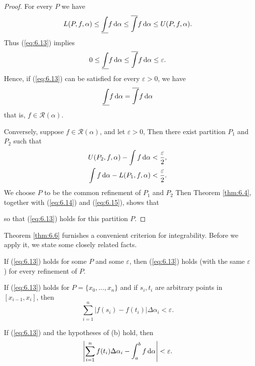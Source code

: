 \begin{proof}
    For every $P$ we have 
    \begin{equation*}
        L(P, f, \alpha)  \leq
        \underline{\int} f \d \alpha \leq
        \overline{\int}  f \d \alpha \leq
        U(P, f, \alpha) .
    \end{equation*}
    Thus (\ref{eq:6.13}) implies 
    \begin{equation*}
        0 \leq
        \underline{\int} f \d \alpha \leq
        \overline{\int}  f \d \alpha \leq
        \varepsilon .
    \end{equation*}
    Hence, if (\ref{eq:6.13}) can be satisfied for every $\varepsilon >0$,
    we have 
    \begin{equation*}
        \underline{\int} f \d \alpha =
        \overline{\int}  f \d \alpha 
    \end{equation*}
    that is, $f \in \mathscr{R}(\alpha)$.

    Conversely, suppose $f \in \mathscr{R}(\alpha)$, and let $\varepsilon > 0$,
    Then there exist partition $P_1$ and $P_2$ such that
    \begin{align}
        \label{eq:6.14}
        U(P_2, f, \alpha) - \int f \d \alpha &< \frac{\varepsilon}{2}, \\
        \label{eq:6.15}
        \int f \d \alpha - L(P_1, f, \alpha) &< \frac{\varepsilon}{2}.
    \end{align}
    We choose $P$ to be the common refinement of $P_1$ and $P_2$ 
    Then Theorem \ref{thm:6.4}, together with (\ref{eq:6.14}) and (\ref{eq:6.15}),
    shows that

    so that (\ref{eq:6.13}) holds for this partition $P$.
\end{proof}

Theorem \ref{thm:6.6} furnishes a convenient criterion for integrability. 
Before we apply it, we state some closely related facts.

\begin{thm}
    \label{thm:6.7}
    \begin{asparaenum}[(a)]
        \item If (\ref{eq:6.13}) holds for some $P$ and some $\varepsilon$,
        then (\ref{eq:6.13}) holds (with the same $\varepsilon$) 
        for every refinement of $P$.
        \item If (\ref{eq:6.13}) holds for $P = \{x_0, ...,x_n\}$ and 
        if $s_i, t_i$ are arbitrary points in $[x_{i-1}, x_i]$, then 
        \begin{equation*}
            \sum_{i=1}^{n} \left| f(s_i) - f(t_i) \right| \Delta \alpha_i < \varepsilon.
        \end{equation*}
        \item If (\ref{eq:6.13}) and the hypotheses of (b) hold, then 
        \begin{equation*}
            \left| \sum_{i=1}^{n}f(t_i)\Delta \alpha_i - \int_{a}^{b} f \d \alpha \right| 
            < \varepsilon.
        \end{equation*}
    \end{asparaenum}
\end{thm}

